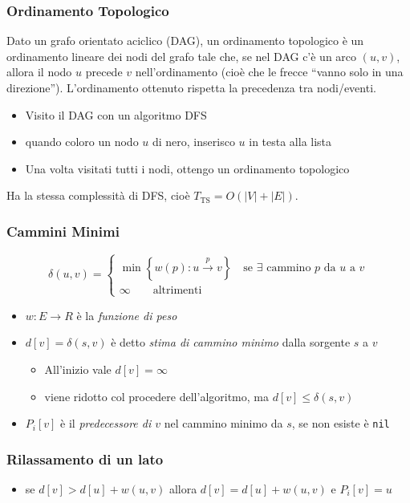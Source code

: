 \documentclass[10pt,a4paper]{article}
\newcommand{\code}{\texttt}
\begin{document}
\begin{multicols*}{2}
\subsubsection*{Ordinamento Topologico}
Dato un grafo orientato aciclico (DAG), un ordinamento topologico è un ordinamento lineare dei nodi del grafo tale che, se nel DAG c'è un arco $(u,v)$, allora il nodo $u$ precede $v$ nell'ordinamento (cioè che le frecce ``vanno solo in una direzione''). L'ordinamento ottenuto rispetta la precedenza tra nodi/eventi.
\begin{itemize}
    \item Visito il DAG con un algoritmo DFS
    \item quando coloro un nodo $u$ di nero, inserisco $u$ in testa alla lista
    \item Una volta visitati tutti i nodi, ottengo un ordinamento topologico 
\end{itemize}
Ha la stessa complessità di DFS, cioè $T_\text{TS} = O(|V| + |E|)$.

\subsubsection*{Cammini Minimi}
\begin{equation*}
    \delta(u,v) = \begin{cases}
        \min\left\{w(p): u\xrightarrow p v\right\} \quad \text{se $\exists$ cammino $p$ da $u$ a $v$}\\
        \infty \qquad \text{altrimenti}
    \end{cases}
\end{equation*}
\begin{itemize}
    \item $w: E \rightarrow R$ è la \emph{funzione di peso}
    \item $d[v] = \delta(s, v)$ è detto \emph{stima di cammino minimo} dalla sorgente $s$ a $v$ 
    \begin{itemize}
        \item All'inizio vale $d[v] = \infty$
        \item viene ridotto col procedere dell'algoritmo, ma $d[v] \le \delta(s, v)$
    \end{itemize}
    \item $P_i[v]$ è il \emph{predecessore di $v$} nel cammino minimo da $s$, se non esiste è \code{nil}
\end{itemize}

\subsubsection*{Rilassamento di un lato}
\begin{itemize}
    \item se $d[v] > d[u]+w(u,v)$ allora $d[v] = d[u] + w(u,v)$ e $P_i[v]=u$
\end{itemize}

\end{multicols*}
\end{document}

